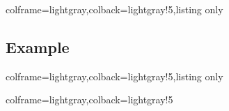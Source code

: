 \documentclass[11pt,a4paper]{ltxdoc}
\begin{document}
\begin{tcblisting}{colframe=lightgray,colback=lightgray!5,listing only}
\def\intlogocardrectotrivial{}
\end{tcblisting}

\subsection{Example}

\begin{tcblisting}{colframe=lightgray,colback=lightgray!5,listing only}

\def\intlogocardversotrivial{%
	\draw (CARD-LOGO) node[rotate=90]
	{\openmoji[height=2.25cm]{game die}\openmoji[height=2.25cm]{glowing star}} ;
}
\def\intlogocardrectotrivial{%
	\draw (CARD-LOGO) node[opacity=0.05]
	{\openmoji[height=4.25cm]{green apple}} ;
}
\end{tcblisting}

\def\intlogocardversotrivial{%
	\draw (CARD-LOGO) node[rotate=90]
	{\openmoji[height=2.25cm]{game die}\openmoji[height=2.25cm]{glowing star}} ;
}
\def\intlogocardrectotrivial{%
	\draw (CARD-LOGO) node[opacity=0.05]
	{\openmoji[height=4.25cm]{green apple}} ;
}
\begin{tcblisting}{colframe=lightgray,colback=lightgray!5}

\end{tcblisting}
\end{document}
